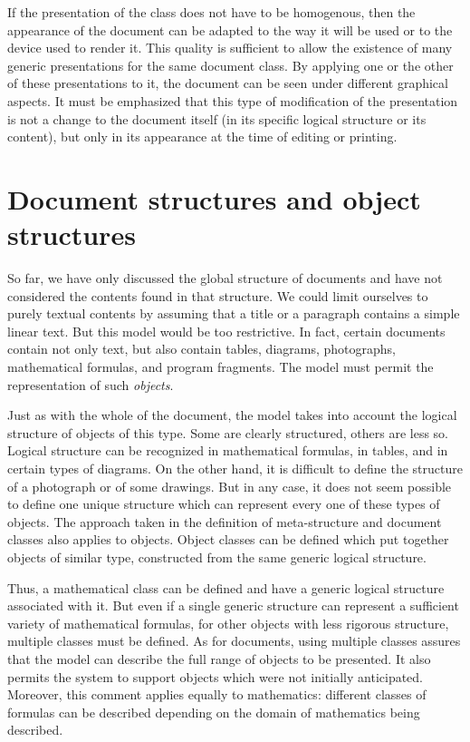 If the presentation of the class does not have to be homogenous, then
the appearance of the document can be adapted to the way it will be
used or to the device used to render it.  This quality is sufficient
to allow the existence of many generic presentations for the same
document class.
\label{presmul}
By applying one or the other of these presentations
to it, the document can be seen under different graphical aspects.  It
must be emphasized that this type of modification of the presentation
is not a change to the document itself (in its specific logical
structure or its content), but only in its appearance at the time of
editing or printing.

\section{Document structures and object structures}

So far, we have only discussed the global structure of documents and
have not considered the contents found in that structure.  We could
limit ourselves to purely textual contents by assuming that a title or
a paragraph contains a simple linear text.  But this model would be
too restrictive.  In fact, certain documents contain not only text,
but also contain tables,  diagrams,  photographs, mathematical
formulas, and program fragments.  The model must permit the
representation of such {\em objects}.

Just as with the whole of the document, the model takes into account
the logical structure of objects of this type.  Some are clearly
structured, others are less so.  Logical structure can be recognized
in mathematical formulas, in tables, and in certain types of
diagrams.  On the other hand, it is difficult to define the structure
of a photograph or of some drawings.  But in any case, it does not
seem possible to define one unique structure which can represent every one
of these types of objects.  The approach taken in the definition of
meta-structure and document classes also applies to objects.  Object
classes can be defined which put together objects of similar type,
constructed from the same generic logical structure.

Thus, a mathematical class can be defined and have a generic logical
structure associated with it.  But even if a single generic structure
can represent a sufficient variety of mathematical formulas, for other
objects with less rigorous structure, multiple classes must be
defined.  As for documents, using multiple classes assures that the
model can describe the full range of objects to be presented.  It also
permits the system to support objects which were not initially
anticipated.  Moreover, this comment applies equally to mathematics:
different classes of formulas can be described depending on the domain
of mathematics being described.

